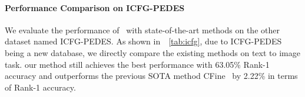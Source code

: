 \begin{table}[t]
\renewcommand\arraystretch{1.06}
\begin{center}
\caption{\small{Comparison with state-of-the-art methods on Domain Generalization task. Best results are labeled in \textbf{bold}.\label{tab:dg}}}
\end{center}

\end{table}


\paragraph{Performance Comparison on ICFG-PEDES}
We evaluate the performance of \ourmodel~with state-of-the-art methods on the other dataset named ICFG-PEDES. As shown in~\tablename~\ref{tab:icfg}, 
due to ICFG-PEDES being a new database, we directly compare the existing methods on text to image task. 
our method still achieves the best performance with 63.05\% Rank-1 accuracy and outperforms the previous SOTA method CFine~\cite{CFine} by 2.22\% in terms of Rank-1 accuracy.

